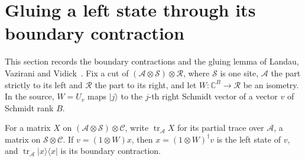 \section{Gluing a left state through its boundary contraction}

This section records the boundary contractions and the gluing lemma of Landau,
Vazirani and Vidick~\cite[lines 409--447]{Landau2013PolynomialTime}. Fix a cut
of $(\mathcal A\otimes\mathcal S)\otimes\mathcal R$, where $\mathcal S$ is one
site, $\mathcal A$ the part strictly to its left and $\mathcal R$ the part to
its right, and let $W:\mathbb C^B\to\mathcal R$ be an isometry. In the source,
$W=U_v$ maps $\lvert j\rangle$ to the $j$-th right Schmidt vector of a vector
$v$ of Schmidt rank $B$.

\begin{definition}
    \label{def:boundary_contraction}
    \leanok
    For a matrix $X$ on $(\mathcal A\otimes\mathcal S)\otimes\mathcal C$, write
    $\operatorname{tr}_{\mathcal A}X$ for its partial trace over
    $\mathcal A$, a matrix on $\mathcal S\otimes\mathcal C$. If
    $v=(1\otimes W)x$, then $x=(1\otimes W)^\dagger v$ is the left state of
    $v$, and $\operatorname{tr}_{\mathcal A}\lvert x\rangle\langle x\rvert$ is
    its boundary contraction.
\end{definition}

